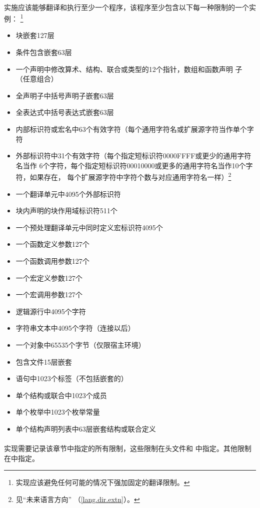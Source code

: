 \paragraph{}
实施应该能够翻译和执行至少一个程序，该程序至少包含以下每一种限制的一个实例：
\footnote{实现应该避免任何可能的情况下强加固定的翻译限制。}
\begin{itemize}
  \item{块嵌套127层}
  \item{条件包含嵌套63层}
  \item{一个声明中修改算术、结构、联合或类型的12个指针，数组和函数声明
     子（任意组合）}
  \item{全声明子中括号声明子嵌套63层}
  \item{全表达式中括号表达式嵌套63层}
  \item{内部标识符或宏名中63个有效字符（每个通用字符名或扩展源字符当作单个字符}
  \item{外部标识符中31个有效字符（每个指定短标识符0000FFFF或更少的通用字符名当作
    6个字符，每个指定短标识符00010000或更多的通用字符名当作10个字符，如果存在，
    每个扩展源字符中字符个数与对应通用字符名一样）\footnote{见``未来语言方向''
    （\ref{lang.dir.extn}）。}}
  \item{一个翻译单元中4095个外部标识符}
  \item{块内声明的块作用域标识符511个}
  \item{一个预处理翻译单元中同时定义宏标识符4095个}
  \item{一个函数定义参数127个}
  \item{一个函数调用参数127个}
  \item{一个宏定义参数127个}
  \item{一个宏调用参数127个}
  \item{逻辑源行中4095个字符}
  \item{字符串文本中4095个字符（连接以后）}
  \item{一个对象中65535个字节（仅限宿主环境）}
  \item{包含文件15层嵌套}
  \item{语句中1023个标签（不包括嵌套的）}
  \item{单个结构或联合中1023个成员}
  \item{单个枚举中1023个枚举常量}
  \item{单个结构声明列表中63层嵌套结构或联合定义}
\end{itemize}

\paragraph{}
实现需要记录该章节中指定的所有限制，这些限制在头文件和
中指定。其他限制在中指定。

